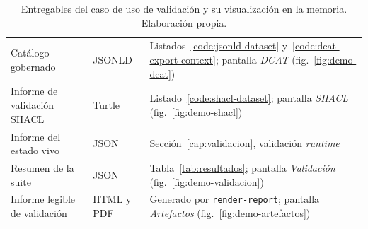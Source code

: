 \begin{table}[ht]
\footnotesize
\centering
\renewcommand{\arraystretch}{1.15}
\begin{tabular}{|L{4.3cm}|L{2.2cm}|L{5.5cm}|}
\hline
{}
 &  &  \\ \hline
Catálogo gobernado & \ac{JSONLD} & Listados~\ref{code:jsonld-dataset} y~\ref{code:dcat-export-context}; pantalla \emph{DCAT} (fig.~\ref{fig:demo-dcat}) \\ \hline
Informe de validación \ac{SHACL} & Turtle & Listado~\ref{code:shacl-dataset}; pantalla \emph{SHACL} (fig.~\ref{fig:demo-shacl}) \\ \hline
Informe del estado vivo & \ac{JSON} & Sección~\ref{cap:validacion}, validación \emph{runtime} \\ \hline
Resumen de la suite & \ac{JSON} & Tabla~\ref{tab:resultados}; pantalla \emph{Validación} (fig.~\ref{fig:demo-validacion}) \\ \hline
Informe legible de validación & HTML y PDF & Generado por \texttt{render-report}; pantalla \emph{Artefactos} (fig.~\ref{fig:demo-artefactos}) \\ \hline
\end{tabular}
\caption{Entregables del caso de uso de validación y su visualización en la memoria. Elaboración propia.}
\label{tab:entregables}
\end{table}
